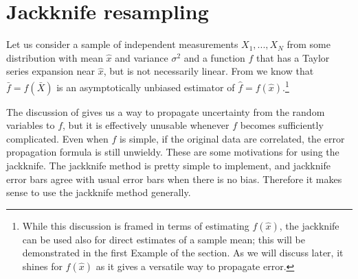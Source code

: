 \section{Jackknife resampling}
Let us consider a sample of independent measurements 
$X_1,...,X_N$ from some distribution with mean $\hat{x}$ and 
variance $\sigma^2$ and a function $f$ that has a Taylor series 
expansion near $\hat{x}$, but is not necessarily linear.
From  we know that $\bar{f}=f(\bar{X})$ is
an asymptotically unbiased estimator of 
$\hat{f}=f(\hat{x})$.\footnote{While this discussion is framed
in terms of estimating $f(\hat{x})$, the jackknife can be used
also for direct estimates of a sample mean; this will be demonstrated
in the first Example of the section. As we will discuss later, it
shines for $f(\hat{x})$ as it gives a versatile way to propagate
error.}

The discussion of  gives us a way to propagate 
uncertainty from the random variables to $f$, but it is effectively 
unusable whenever $f$ becomes sufficiently complicated. 
Even when $f$ is simple, if the original data are correlated, the 
error propagation formula  is still 
unwieldy. These are some motivations for using the jackknife.
The jackknife method is pretty simple to implement, and jackknife error 
bars agree with usual error bars when there is no bias.
Therefore it makes sense to use the jackknife method generally. 

